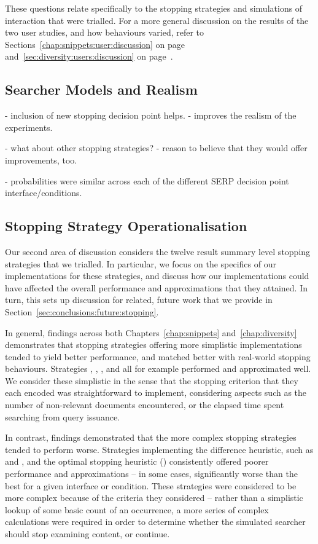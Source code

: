 These questions relate specifically to the stopping strategies and simulations of interaction that were trialled. For a more general discussion on the results of the two user studies, and how behaviours varied, refer to Sections~\ref{chap:snippets:user:discussion} on page~\pageref{chap:snippets:user:discussion} and~\ref{sec:diversity:users:discussion} on page~\pageref{sec:diversity:users:discussion}.

\subsection{Searcher Models and Realism}

- inclusion of new stopping decision point helps.
- improves the realism of the experiments.

- what about other stopping strategies?
    - reason to believe that they would offer improvements, too.

- probabilities were similar across each of the different SERP decision point interface/conditions.

\subsection{Stopping Strategy Operationalisation}
Our second area of discussion considers the twelve result summary level stopping strategies that we trialled. In particular, we focus on the specifics of our implementations for these strategies, and discuss how our implementations could have affected the overall performance and approximations that they attained. In turn, this sets up discussion for related, future work that we provide in Section~\ref{sec:conclusions:future:stopping}.

In general, findings across both Chapters~\ref{chap:snippets} and~\ref{chap:diversity} demonstrates that stopping strategies offering more simplistic implementations tended to yield better performance, and matched better with real-world stopping behaviours. Strategies , , ,  and  all for example performed and approximated well. We consider these simplistic in the sense that the stopping criterion that they each encoded was straightforward to implement, considering aspects such as the number of non-relevant documents encountered, or the elapsed time spent searching from query issuance.

In contrast, findings demonstrated that the more complex stopping strategies tended to perform worse. Strategies implementing the difference heuristic, such as  and , and the optimal stopping heuristic () consistently offered poorer performance and approximations -- in some cases, significantly worse than the best for a given interface or condition. These strategies were considered to be more complex because of the criteria they considered -- rather than a simplistic lookup of some basic count of an occurrence, a more series of complex calculations were required in order to determine whether the simulated searcher should stop examining content, or continue.

